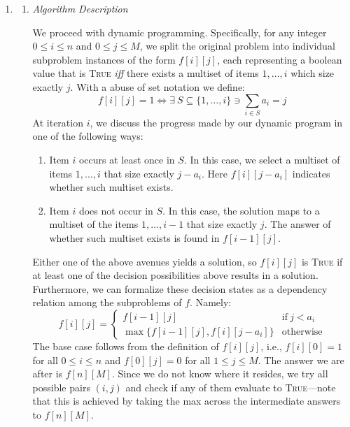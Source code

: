 \documentclass{article}
\begin{document}
\begin{enumerate}[leftmargin={*}, font={\bf}, label={\arabic*.}, ref={\arabic*}]
  \item \label{qst:1}
    \begin{enumerate}
      \item \label{qst:1a}
        {\itshape Algorithm Description}

        We proceed with dynamic programming. Specifically, for any integer $0 \leq i \leq n$ and
        $0 \leq j \leq M$, we split the original problem into individual subproblem instances of
        the form $f[i][j]$, each representing a boolean value that is \textsc{True} \textit{iff}
        there exists a multiset of items $1, \ldots, i$ which size exactly $j$. With a abuse of
        set notation we define:
        \[
          f[i][j] = 1 \iff \exists\ S \subseteq \{1, \ldots, i\} \ni \sum_{i \in S} a_i = j
        \]
        At iteration $i$, we discuss the progress made by our dynamic program in one of the
        following ways:
        \begin{enumerate}[label={(\arabic*)}, itemsep={0pt}]
          \item
            Item $i$ occurs at least once in $S$. In this case, we select a multiset of items $1,
            \ldots, i$ that size exactly $j-a_i$. Here $f[i][j-a_i]$ indicates whether such multiset
            exists.
          \item
            Item $i$ does not occur in $S$. In this case, the solution maps to a multiset of the
            items $1, \ldots, i-1$ that size exactly $j$. The answer of whether such multiset exists
            is found in $f[i-1][j]$.
        \end{enumerate}
        Either one of the above avenues yields a solution, so $f[i][j]$ is \textsc{True} if at least
        one of the decision possibilities above results in a solution. Furthermore, we can formalize
        these decision states as a dependency relation among the subproblems of $f$. Namely:
        \[
          f[i][j] = 
          \begin{cases}
            f[i-1][j] & \text{if}\ j < a_i \\
            \max\big\{f[i-1][j], f[i][j-a_i]\big\} & \text{otherwise}
          \end{cases}
        \]
        The base case follows from the definition of $f[i][j]$, i.e., $f[i][0] = 1$ for all $0 \leq
        i \leq n$ and $f[0][j] = 0$ for all $1 \leq j \leq M$. The answer we are after is $f[n][M]$.
        Since we do not know where it resides, we try all possible pairs $(i,j)$ and check if any of
        them evaluate to \textsc{True}---note that this is achieved by taking the max across the
        intermediate answers to $f[n][M]$.


\end{enumerate}
\end{enumerate}
\end{document}
